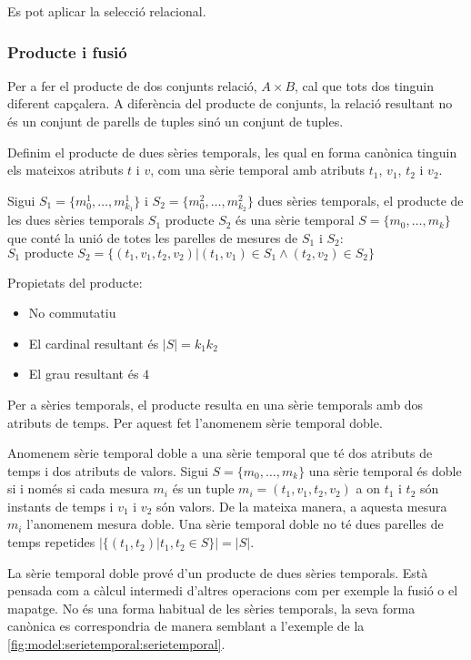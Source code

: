 Es pot aplicar la selecció relacional.



\subsubsection{Producte i fusió}


Per a fer el producte de dos conjunts relació, $A \times B$, cal que
tots dos tinguin diferent capçalera. A diferència del producte de
conjunts, la relació resultant no és un conjunt de parells de tuples
sinó un conjunt de tuples. 


Definim el producte de dues sèries temporals, les qual en forma
canònica tinguin els mateixos atributs $t$ i $v$, com una sèrie
temporal amb atributs $t_1$, $v_1$, $t_2$ i $v_2$.
\begin{definition}[producte]
  Sigui $S_1=\{m_0^1, \dotsc, m_{k_1}^1\}$ i $S_2=\{m_0^2, \dotsc,
  m_{k_2}^2\}$ dues sèries temporals, el producte de les dues sèries
  temporals $S_1 \text{ producte } S_2$ és una sèrie temporal $S=\{m_0, \dotsc,
  m_k\}$ que conté la unió de totes les parelles de mesures de $S_1$ i
  $S_2$: $S_1 \text{ producte } S_2 = \{ (t_1,v_1,t_2,v_2) | (t_1,v_1) \in S_1
  \wedge (t_2,v_2) \in S_2 \}$
\end{definition}

Propietats del producte:
\begin{itemize}
\item No commutatiu
\item El cardinal resultant és $|S|=k_1k_2$
\item El grau resultant és $4$
\end{itemize}


Per a sèries temporals, el producte resulta en una sèrie temporals amb
dos atributs de temps. Per aquest fet l'anomenem sèrie temporal doble.
\begin{definition}
  Anomenem sèrie temporal doble a una sèrie temporal que té dos
  atributs de temps i dos atributs de valors. Sigui $S =\{m_0, \dotsc,
  m_k\}$ una sèrie temporal és doble si i només si cada mesura $m_i$
  és un tuple $m_i=(t_1,v_1,t_2,v_2)$ a on $t_1$ i $t_2$ són instants
  de temps i $v_1$ i $v_2$ són valors. De la mateixa manera, a aquesta
  mesura $m_i$ l'anomenem mesura doble.  Una sèrie temporal doble no
  té dues parelles de temps repetides $|\{(t_1,t_2) | t_1,t_2\in S\}|
  = |S|$.
\end{definition}

La sèrie temporal doble prové d'un producte de dues sèries
temporals. Està pensada com a càlcul intermedi d'altres operacions com
per exemple la fusió o el mapatge.  No és una forma habitual de les
sèries temporals, la seva forma canònica es correspondria de manera
semblant a l'exemple de la
\autoref{fig:model:serietemporal:serietemporal}.




